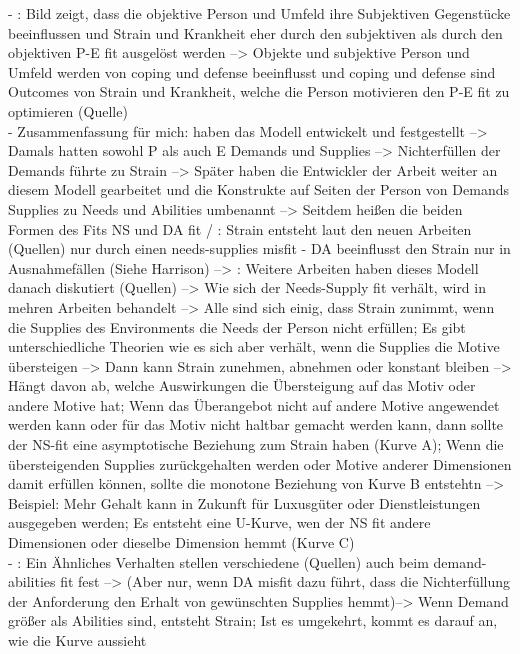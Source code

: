 - \cite[S. 20]{edwards:2008}: Bild zeigt, dass die objektive Person und Umfeld ihre Subjektiven Gegenstücke beeinflussen und Strain und Krankheit eher durch den subjektiven als durch den objektiven P-E fit ausgelöst werden --> Objekte und subjektive Person und Umfeld werden von coping und defense beeinflusst und coping und defense sind Outcomes von Strain und Krankheit, welche die Person motivieren den P-E fit zu optimieren (Quelle) \\
- Zusammenfassung für mich: \textcite{copingAndAdaption:1974} haben das Modell entwickelt und festgestellt --> Damals hatten sowohl P als auch E Demands und Supplies --> Nichterfüllen der Demands führte zu Strain --> Später haben die Entwickler der Arbeit weiter an diesem Modell gearbeitet und die Konstrukte auf Seiten der Person von Demands Supplies zu Needs und Abilities umbenannt --> Seitdem heißen die beiden Formen des Fits NS und DA fit / \cite[S. 20]{edwards:2008}: Strain entsteht laut den neuen Arbeiten (Quellen) nur durch einen needs-supplies misfit - DA beeinflusst den Strain nur in Ausnahmefällen (Siehe Harrison) --> \cite[S. 21]{edwards:2008}: Weitere Arbeiten haben dieses Modell danach diskutiert (Quellen) --> Wie sich der Needs-Supply fit verhält, wird in mehren Arbeiten behandelt --> Alle sind sich einig, dass Strain zunimmt, wenn die Supplies des Environments die Needs der Person nicht erfüllen; Es gibt unterschiedliche Theorien wie es sich aber verhält, wenn die Supplies die Motive übersteigen --> Dann kann Strain zunehmen, abnehmen oder konstant bleiben --> Hängt davon ab, welche Auswirkungen die Übersteigung auf das Motiv oder andere Motive hat; Wenn das Überangebot nicht auf andere Motive angewendet werden kann oder für das Motiv nicht haltbar gemacht werden kann, dann sollte der NS-fit eine asymptotische Beziehung zum Strain haben (Kurve A); Wenn die übersteigenden Supplies zurückgehalten werden oder Motive anderer Dimensionen damit erfüllen können, sollte die monotone Beziehung von Kurve B entstehtn --> Beispiel: Mehr Gehalt kann in Zukunft für Luxusgüter oder Dienstleistungen ausgegeben werden; Es entsteht eine U-Kurve, wen der NS fit andere Dimensionen oder dieselbe Dimension hemmt (Kurve C) \\
- \cite[S. 22f.]{edwards:2008}: Ein Ähnliches Verhalten stellen verschiedene (Quellen) auch beim demand-abilities fit fest --> (Aber nur, wenn DA misfit dazu führt, dass die Nichterfüllung der Anforderung den Erhalt von gewünschten Supplies hemmt)--> Wenn Demand größer als Abilities sind, entsteht Strain; Ist es umgekehrt, kommt es darauf an, wie die Kurve aussieht \\
